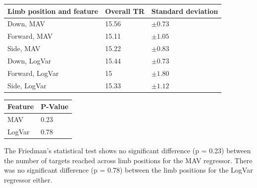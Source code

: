	\begin{center}
		\begin{tabular}{l l l}
			\toprule
			\textbf{Limb position and feature} & \textbf{Overall TR} & \textbf{Standard deviation}\\
			\midrule
			Down, MAV & 15.56 & $\pm 0.73$ \\
			Forward, MAV & 15.11 & $\pm 1.05$ \\
			Side, MAV & 15.22 & $\pm 0.83$ \\
			Down, LogVar & 15.44 & $\pm 0.73$ \\
			Forward, LogVar & 15 & $\pm 1.80$ \\
			Side, LogVar & 15.33 & $\pm 1.12$ \\
			\bottomrule
		\end{tabular}
	\end{center}

	\begin{center}
		\begin{tabular}{l l}
			\toprule
			\textbf{Feature} & \textbf{P-Value}\\
			\midrule
			MAV & 0.23 \\
			LogVar & 0.78 \\
			\bottomrule
		\end{tabular}
	\end{center}
	
The Friedman's statistical test shows no significant difference (p = 0.23) between the number of targets reached across limb positions for the MAV regressor. There was no significant difference (p = 0.78) between the limb positions for the LogVar regressor either.


